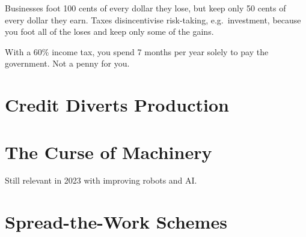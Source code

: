 \begin{outline}
\1 Businesses foot 100 cents of every dollar they lose, but keep only 50 cents of every dollar they earn.
	\2 Taxes disincentivise risk-taking, e.g.\ investment, because you foot all of the loses and keep only some of the gains.

\1 With a 60\% income tax, you spend 7 months per year solely to pay the government. Not a penny for you.

\end{outline}

\section{Credit Diverts Production}

\section{The Curse of Machinery}
\begin{outline}
\1 Still relevant in 2023 with improving robots and AI.
\end{outline}

\section{Spread-the-Work Schemes}
\begin{outline}
\1 
\end{outline}

